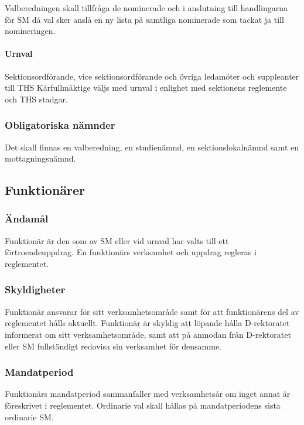 \documentclass{dgovdoc}
\begin{document}
Valberedningen skall tillfråga de nominerade och i anslutning till handlingarna
för SM då val sker anslå en ny lista på samtliga nominerade som tackat ja till
nomineringen.

\paragraph{Urnval}

Sektionsordförande, vice sektionsordförande och övriga ledamöter och
suppleanter till THS Kårfullmäktige väljs med urnval i enlighet med sektionens
reglemente och THS stadgar.

\subsubsection{Obligatoriska nämnder}

Det skall finnas en valberedning, en studienämnd, en sektionslokalnämnd samt en
mottagningsnämnd.

\subsection{Funktionärer}

\subsubsection{Ändamål}

Funktionär är den som av SM eller vid urnval har valts till ett
förtroendeuppdrag. En funktionärs verksamhet och uppdrag regleras i
reglementet.

\subsubsection{Skyldigheter}

Funktionär ansvarar för sitt verksamhetsområde samt för att funktionärens del
av reglementet hålls aktuellt. Funktionär är skyldig att löpande hålla
D-rektoratet informerat om sitt verksamhetsområde, samt att på anmodan från
D-rektoratet eller SM fullständigt redovisa sin verksamhet för densamme.

\subsubsection{Mandatperiod}

Funktionärs mandatperiod sammanfaller med verksamhetsår om inget annat är
föreskrivet i reglementet. Ordinarie val skall hållas på mandatperiodens sista
ordinarie SM.
\end{document}
